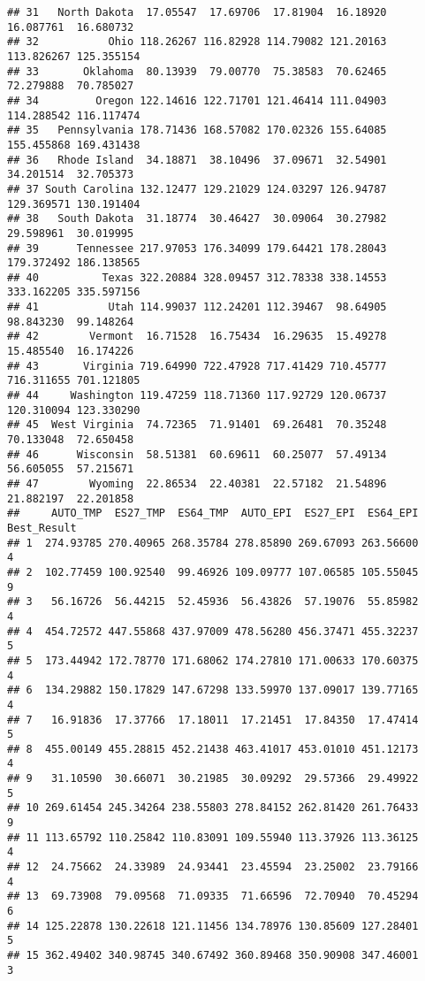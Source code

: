 \documentclass[
]{article}
\begin{document}
\begin{verbatim}
## 31   North Dakota  17.05547  17.69706  17.81904  16.18920  16.087761  16.680732
## 32           Ohio 118.26267 116.82928 114.79082 121.20163 113.826267 125.355154
## 33       Oklahoma  80.13939  79.00770  75.38583  70.62465  72.279888  70.785027
## 34         Oregon 122.14616 122.71701 121.46414 111.04903 114.288542 116.117474
## 35   Pennsylvania 178.71436 168.57082 170.02326 155.64085 155.455868 169.431438
## 36   Rhode Island  34.18871  38.10496  37.09671  32.54901  34.201514  32.705373
## 37 South Carolina 132.12477 129.21029 124.03297 126.94787 129.369571 130.191404
## 38   South Dakota  31.18774  30.46427  30.09064  30.27982  29.598961  30.019995
## 39      Tennessee 217.97053 176.34099 179.64421 178.28043 179.372492 186.138565
## 40          Texas 322.20884 328.09457 312.78338 338.14553 333.162205 335.597156
## 41           Utah 114.99037 112.24201 112.39467  98.64905  98.843230  99.148264
## 42        Vermont  16.71528  16.75434  16.29635  15.49278  15.485540  16.174226
## 43       Virginia 719.64990 722.47928 717.41429 710.45777 716.311655 701.121805
## 44     Washington 119.47259 118.71360 117.92729 120.06737 120.310094 123.330290
## 45  West Virginia  74.72365  71.91401  69.26481  70.35248  70.133048  72.650458
## 46      Wisconsin  58.51381  60.69611  60.25077  57.49134  56.605055  57.215671
## 47        Wyoming  22.86534  22.40381  22.57182  21.54896  21.882197  22.201858
##     AUTO_TMP  ES27_TMP  ES64_TMP  AUTO_EPI  ES27_EPI  ES64_EPI Best_Result
## 1  274.93785 270.40965 268.35784 278.85890 269.67093 263.56600           4
## 2  102.77459 100.92540  99.46926 109.09777 107.06585 105.55045           9
## 3   56.16726  56.44215  52.45936  56.43826  57.19076  55.85982           4
## 4  454.72572 447.55868 437.97009 478.56280 456.37471 455.32237           5
## 5  173.44942 172.78770 171.68062 174.27810 171.00633 170.60375           4
## 6  134.29882 150.17829 147.67298 133.59970 137.09017 139.77165           4
## 7   16.91836  17.37766  17.18011  17.21451  17.84350  17.47414           5
## 8  455.00149 455.28815 452.21438 463.41017 453.01010 451.12173           4
## 9   31.10590  30.66071  30.21985  30.09292  29.57366  29.49922           5
## 10 269.61454 245.34264 238.55803 278.84152 262.81420 261.76433           9
## 11 113.65792 110.25842 110.83091 109.55940 113.37926 113.36125           4
## 12  24.75662  24.33989  24.93441  23.45594  23.25002  23.79166           4
## 13  69.73908  79.09568  71.09335  71.66596  72.70940  70.45294           6
## 14 125.22878 130.22618 121.11456 134.78976 130.85609 127.28401           5
## 15 362.49402 340.98745 340.67492 360.89468 350.90908 347.46001           3

\end{verbatim}
\end{document}

